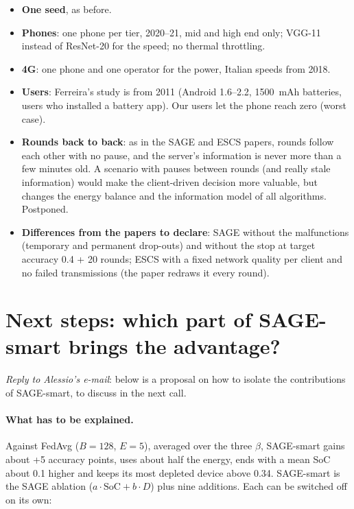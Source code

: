 \documentclass[11pt,a4paper]{article}
\begin{document}
\begin{itemize}
  \item \textbf{One seed}, as before.
  \item \textbf{Phones}: one phone per tier, 2020--21, mid and high end only;
        VGG-11 instead of ResNet-20 for the speed; no thermal throttling.
  \item \textbf{4G}: one phone and one operator for the power, Italian speeds
        from 2018.
  \item \textbf{Users}: Ferreira's study is from 2011 (Android 1.6--2.2,
        1500~mAh batteries, users who installed a battery app). Our users let
        the phone reach zero (worst case).
  \item \textbf{Rounds back to back}: as in the SAGE and ESCS papers, rounds
        follow each other with no pause, and the server's information is
        never more than a few minutes old. A scenario with pauses between
        rounds (and really stale information) would make the client-driven
        decision more valuable, but changes the energy balance and the
        information model of all algorithms. Postponed.
  \item \textbf{Differences from the papers to declare}: SAGE without the
        malfunctions (temporary and permanent drop-outs) and without the stop
        at target accuracy 0.4 + 20 rounds; ESCS with a fixed network quality
        per client and no failed transmissions (the paper redraws it every
        round).
\end{itemize}

\section{Next steps: which part of SAGE-smart brings the advantage?}
\label{sec:next}

\emph{Reply to Alessio's e-mail}: below is a proposal on how to isolate the
contributions of SAGE-smart, to discuss in the next call.

\paragraph{What has to be explained.} Against FedAvg ($B=128$, $E=5$),
averaged over the three $\beta$, SAGE-smart gains about +5 accuracy points,
uses about half the energy, ends with a mean SoC about 0.1 higher and keeps
its most depleted device above 0.34. SAGE-smart is the SAGE ablation
($a\cdot\mathrm{SoC} + b\cdot D$) plus nine additions. Each can be switched off
on its own:
\end{document}

